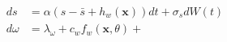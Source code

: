\begin{align}
    ds &= \alpha(s-\bar{s}+h_w(\mathbf x)) dt + \sigma_s dW(t) \\
    d\omega &= \lambda_\omega + c_w f_w(\mathbf x,\theta) + 
\end{align}